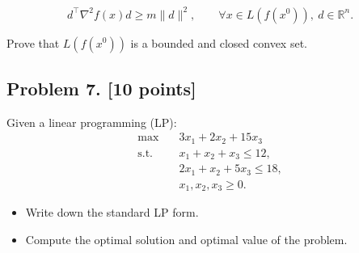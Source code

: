 \documentclass[11pt,a4paper]{article}
\begin{document}
\[
d^{\top} \nabla^{2} f(x) d \ge m \|d\|^{2}, \qquad \forall x \in L(f(x^{0})),\ d \in \mathbb{R}^{n}.
\]

Prove that \(L(f(x^{0}))\) is a bounded and closed convex set.

\subsection{Problem 7. [10 points]}
Given a linear programming (LP):
\begin{align*}
\max\quad & 3x_{1} + 2x_{2} + 15x_{3} \\
\text{s.t.}\quad & x_{1} + x_{2} + x_{3} \le 12, \\
& 2x_{1} + x_{2} + 5x_{3} \le 18, \\
& x_{1}, x_{2}, x_{3} \ge 0.
\end{align*}
\begin{itemize}
    \item Write down the standard LP form.
    \item Compute the optimal solution and optimal value of the problem.
\end{itemize}
\end{document}
